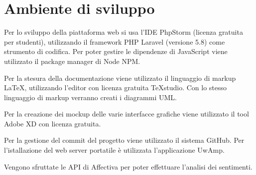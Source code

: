 \section{Ambiente di sviluppo}
Per lo sviluppo della piattaforma web si usa l'IDE PhpStorm (licenza gratuita 
per studenti), utilizzando il framework PHP Laravel (versione 5.8) come 
strumento di codifica. Per poter gestire le dipendenze di JavaScript viene 
utilizzato il package manager di Node NPM.

Per la stesura della documentazione viene utilizzato il linguaggio di markup 
LaTeX, utilizzando l'editor con licenza gratuita TeXstudio. Con lo stesso 
linguaggio di markup verranno creati i diagrammi UML.

Per la creazione dei mockup delle varie interfacce grafiche viene utilizzato il 
tool Adobe XD con licenza gratuita. 

Per la gestione del commit del progetto viene utilizzato il sistema GitHub. Per 
l'istallazione del web server portatile è utilizzata l'applicazione UwAmp.

Vengono sfruttate le API di Affectiva per poter effettuare l'analisi dei 
sentimenti.
